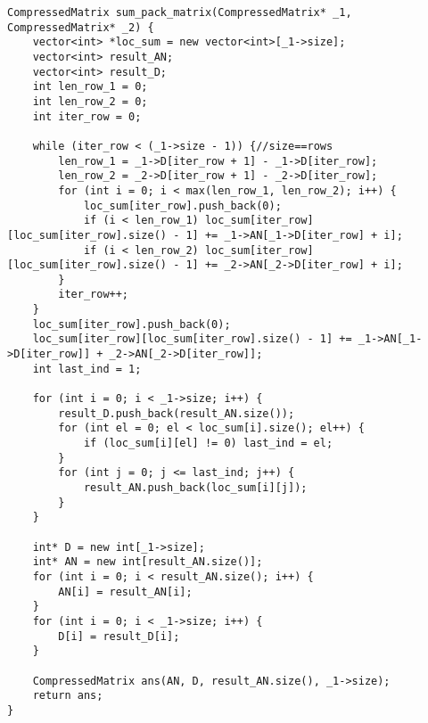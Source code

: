 \begin{lstlisting}[label = list5, caption = Программная реализация алгоритма сложения мартиц сажтаых по схеме Дженнингса]
CompressedMatrix sum_pack_matrix(CompressedMatrix* _1, CompressedMatrix* _2) {
	vector<int> *loc_sum = new vector<int>[_1->size];
	vector<int> result_AN;
	vector<int> result_D;
	int len_row_1 = 0;
	int len_row_2 = 0;
	int iter_row = 0;
	
	while (iter_row < (_1->size - 1)) {//size==rows
		len_row_1 = _1->D[iter_row + 1] - _1->D[iter_row];
		len_row_2 = _2->D[iter_row + 1] - _2->D[iter_row];
		for (int i = 0; i < max(len_row_1, len_row_2); i++) {
			loc_sum[iter_row].push_back(0);
			if (i < len_row_1) loc_sum[iter_row][loc_sum[iter_row].size() - 1] += _1->AN[_1->D[iter_row] + i];
			if (i < len_row_2) loc_sum[iter_row][loc_sum[iter_row].size() - 1] += _2->AN[_2->D[iter_row] + i];
		}
		iter_row++;
	}
	loc_sum[iter_row].push_back(0);
	loc_sum[iter_row][loc_sum[iter_row].size() - 1] += _1->AN[_1->D[iter_row]] + _2->AN[_2->D[iter_row]];
	int last_ind = 1;
	
	for (int i = 0; i < _1->size; i++) {
		result_D.push_back(result_AN.size());
		for (int el = 0; el < loc_sum[i].size(); el++) {
			if (loc_sum[i][el] != 0) last_ind = el;
		}
		for (int j = 0; j <= last_ind; j++) {
			result_AN.push_back(loc_sum[i][j]);
		}
	}
	
	int* D = new int[_1->size];
	int* AN = new int[result_AN.size()];
	for (int i = 0; i < result_AN.size(); i++) {
		AN[i] = result_AN[i];
	}
	for (int i = 0; i < _1->size; i++) {
		D[i] = result_D[i];
	}
	
	CompressedMatrix ans(AN, D, result_AN.size(), _1->size);
	return ans;
}
\end{lstlisting}

